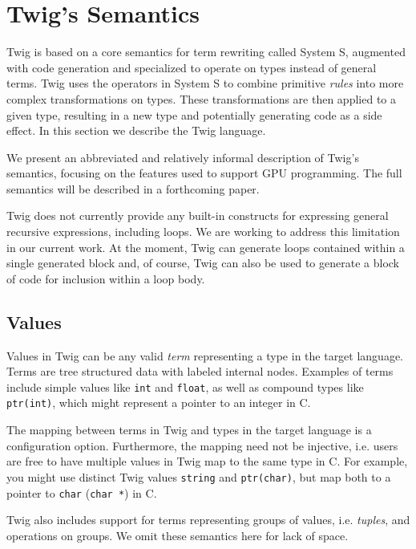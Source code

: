 
\section{Twig's Semantics}
\label{sec:semantics}

Twig is based on a core semantics for term rewriting called System
S\cite{system-s}, augmented with code generation and specialized
to operate on types instead of general terms. Twig uses the
operators in System S to combine primitive \emph{rules} into more
complex transformations on types. These transformations are then
applied to a given type, resulting in a new type and potentially
generating code as a side effect. In this section we describe the
Twig language.

We present an abbreviated and relatively informal description of
Twig's semantics, focusing on the features used to support GPU
programming. The full semantics will be described in a forthcoming
paper.

Twig does not currently provide any built-in constructs for
expressing general recursive expressions, including loops. We are
working to address this limitation in our current work. At the
moment, Twig can generate loops contained within a single
generated block and, of course, Twig can also be used to generate
a block of code for inclusion within a loop body.

\subsection{Values}

Values in Twig can be any valid \emph{term} representing a type in
the target language. Terms are tree structured data with labeled
internal nodes. Examples of terms include simple values like
\texttt{int} and \texttt{float}, as well as compound types like
\texttt{ptr(int)}, which might represent a pointer to an integer
in C.

The mapping between terms in Twig and types in the target language
is a configuration option. Furthermore, the mapping need not be
injective, i.e. users are free to have multiple values in Twig map
to the same type in C. For example, you might use distinct Twig
values \texttt{string} and \texttt{ptr(char)}, but map both to a
pointer to \texttt{char} (\texttt{char *}) in C.

Twig also includes support for terms representing groups of
values, i.e. \emph{tuples}, and operations on groups. We omit
these semantics here for lack of space.

